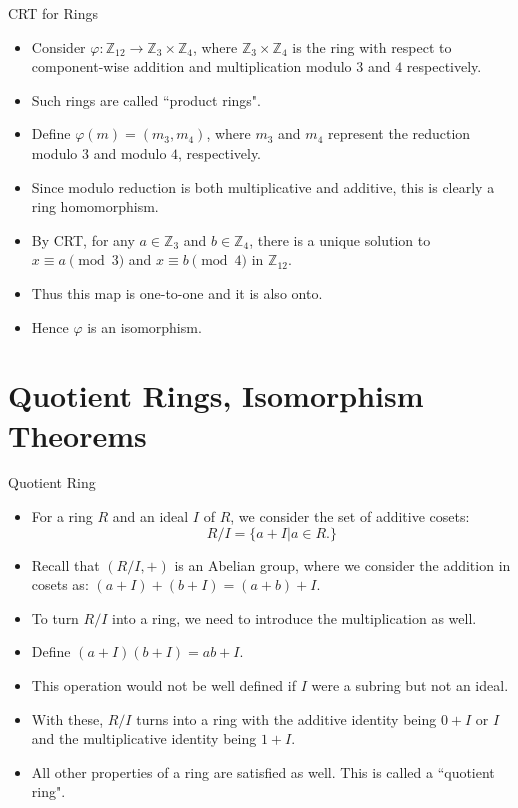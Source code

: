 \documentclass[ %
 10pt, xcolor={dvipsnames,svgnames,x11names,hyperref},
   hyperref={colorlinks=true,citecolor=green,linkcolor=DarkRed,urlcolor=ProcessBlue,anchorcolor=blue}
  ]{beamer}
\newenvironment{stepitemize}{\begin{itemize}[<+->]}{\end{itemize} }
\newcommand{\Z}{\mathbb{Z}}
\begin{document}
\begin{frame}{CRT for Rings}
\begin{stepitemize}
\item Consider $\varphi:\Z_{12}\rightarrow \Z_{3}\times \Z_{4}$, where $\Z_3\times \Z_4$ is the ring with respect to component-wise addition and multiplication modulo $3$ and $4$ respectively.
\item Such rings are called ``product rings".
\item Define $\varphi(m) = (m_3, m_4)$, where $m_3$ and $m_4$ represent the reduction modulo $3$ and modulo $4$, respectively.
\item Since modulo reduction is both multiplicative and additive, this is clearly a ring homomorphism.
\item By CRT, for any $a \in \Z_3$ and $b\in \Z_4$, there is a unique solution to  $x\equiv a \pmod{3}$ and $x\equiv b\pmod{4}$ in $\Z_{12}$.
\item Thus this map is one-to-one and it is also onto.
\item Hence $\varphi$ is an isomorphism.
\end{stepitemize}
\end{frame}

\section{Quotient Rings, Isomorphism Theorems}

\begin{frame}{Quotient Ring}
\begin{stepitemize}
    \item For a ring $R$ and an ideal $I$ of $R$, we consider the set of additive cosets:
$$R/I = \{a+I|a\in R.\}$$
\item Recall that $(R/I,+)$ is an Abelian group, where we consider the addition in cosets as: $(a+I)+(b+I) = (a+b)+I$.
\item To turn $R/I$ into a ring, we need to introduce the multiplication as well.
\item Define $(a+I)(b+I)=ab+I$.
\item This operation would not be well defined if $I$ were a subring but not an ideal.
\item With these, $R/I$ turns into a ring with the additive identity being $0+I$ or $I$ and the multiplicative identity being $1+I$.
\item All other properties of a ring are satisfied as well. This is called a ``quotient ring".
\end{stepitemize}
\end{frame}
\end{document}
